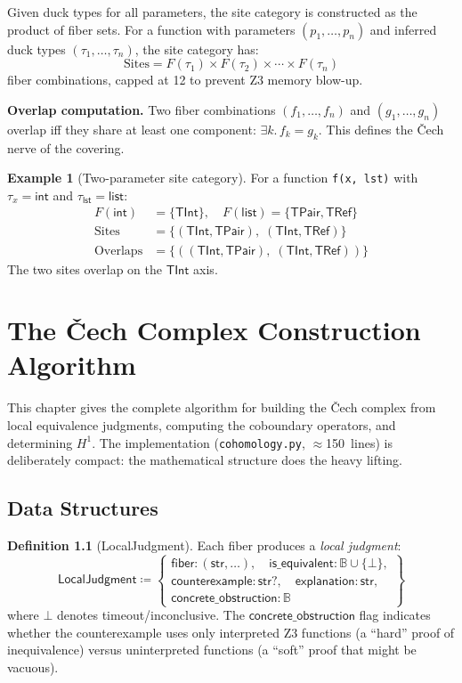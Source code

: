 \documentclass[11pt,a4paper]{report}
\theoremstyle{definition}
\newtheorem{definition}{Definition}[chapter]
\newtheorem{example}[definition]{Example}
\theoremstyle{plain}
\newcommand{\Bool}{\mathbb{B}}
\newcommand{\Hone}{H^1}
\begin{document}
Given duck types for all parameters, the site category is
constructed as the product of fiber sets.
For a function with parameters $(p_1, \ldots, p_n)$ and inferred
duck types $(\tau_1, \ldots, \tau_n)$, the site category has:
\[
  \mathrm{Sites} = F(\tau_1) \times F(\tau_2) \times \cdots \times
    F(\tau_n)
\]
fiber combinations, capped at 12 to prevent Z3 memory blow-up.

\textbf{Overlap computation.}  Two fiber combinations
$(f_1, \ldots, f_n)$ and $(g_1, \ldots, g_n)$ overlap iff they
share at least one component: $\exists k.\, f_k = g_k$.  This
defines the \v{C}ech nerve of the covering.

\begin{example}[Two-parameter site category]
For a function \texttt{f(x, lst)} with $\tau_x = \mathsf{int}$
and $\tau_\mathsf{lst} = \mathsf{list}$:
\begin{align*}
  F(\mathsf{int}) &= \{\mathsf{TInt}\}, \quad
  F(\mathsf{list}) = \{\mathsf{TPair}, \mathsf{TRef}\} \\
  \mathrm{Sites} &= \{(\mathsf{TInt}, \mathsf{TPair}),\;
    (\mathsf{TInt}, \mathsf{TRef})\} \\
  \mathrm{Overlaps} &= \{((\mathsf{TInt}, \mathsf{TPair}),\;
    (\mathsf{TInt}, \mathsf{TRef}))\}
\end{align*}
The two sites overlap on the $\mathsf{TInt}$ axis.
\end{example}


\chapter{The \v{C}ech Complex Construction Algorithm}
\label{ch:cech-algorithm}

This chapter gives the complete algorithm for building the \v{C}ech
complex from local equivalence judgments, computing the coboundary
operators, and determining $\Hone$.  The implementation
(\texttt{cohomology.py}, $\approx$150~lines) is deliberately compact:
the mathematical structure does the heavy lifting.

\section{Data Structures}

\begin{definition}[LocalJudgment]
Each fiber produces a \emph{local judgment}:
\[
  \mathsf{LocalJudgment} \coloneqq \left\{
  \begin{array}{l}
    \mathsf{fiber} : (\mathsf{str}, \ldots), \quad
    \mathsf{is\_equivalent} : \Bool \cup \{\bot\}, \\
    \mathsf{counterexample} : \mathsf{str}?, \quad
    \mathsf{explanation} : \mathsf{str}, \\
    \mathsf{concrete\_obstruction} : \Bool
  \end{array}\right\}
\]
where $\bot$ denotes timeout/inconclusive.
The $\mathsf{concrete\_obstruction}$ flag indicates whether the
counterexample uses only interpreted Z3 functions (a ``hard''
proof of inequivalence) versus uninterpreted functions (a ``soft''
proof that might be vacuous).
\end{definition}
\end{document}
